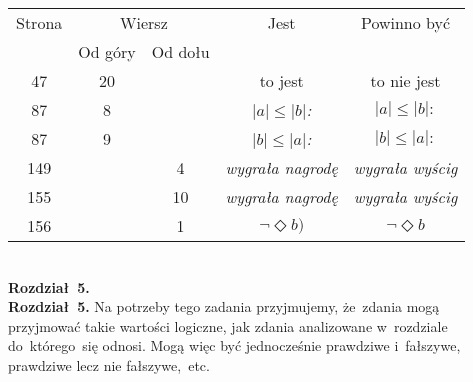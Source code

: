 \documentclass[a4paper,11pt]{article}
\numberwithin{equation}{section}
\begin{document}
\begin{center}

  \begin{tabular}{|c|c|c|c|c|}
    \hline
    Strona & \multicolumn{2}{c|}{Wiersz} & Jest
    & Powinno być \\ \cline{2-3}
    & Od góry & Od dołu & & \\
    \hline
    \hphantom{0}47 & 20 & & to jest & to nie jest \\
    \hphantom{0}87 & \hphantom{0}8 &
    & $| a | \!\! \leq | b |$\textit{:} & $| a | \leq | b |:$ \\
    \hphantom{0}87 & \hphantom{0}9 &
    & $| b | \!\! \leq | a |$\textit{:} & $| b | \leq | a |:$ \\
    149 & & \hphantom{0}4 & \textit{wygrała nagrodę}
    & \textit{wygrała wyścig} \\
    155 & & 10 & \textit{wygrała nagrodę} & \textit{wygrała wyścig} \\
    156 & & \hphantom{0}1 & $\neg \Diamond b)$ & $\neg \Diamond b$ \\
    \hline
  \end{tabular}







\end{center}

\VerSpaceTwo


\noindent
{} \\
\Jest \textbf{Rozdział~5.} \\
\PowinnoByc \textbf{Rozdział~5.} Na potrzeby tego zadania przyjmujemy,
że~zdania mogą przyjmować takie wartości logiczne, jak zdania analizowane
w~rozdziale do~którego~się odnosi. Mogą więc być jednocześnie prawdziwe
i~fałszywe, prawdziwe lecz nie fałszywe,~etc.
\end{document}
